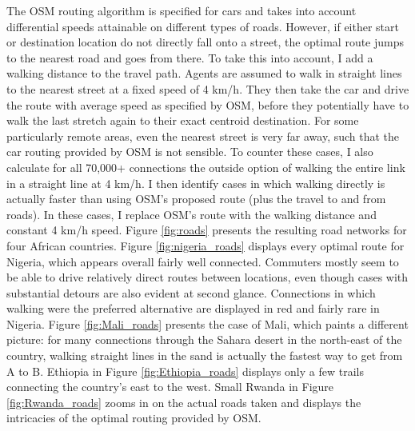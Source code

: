 \documentclass[11pt, oneside]{article}   	%
\begin{document}
The OSM routing algorithm is specified for cars and takes into account differential speeds attainable on different types of roads. However, if either start or destination location do not directly fall onto a street, the optimal route jumps to the nearest road and goes from there. To take this into account, I add a walking distance to the travel path. Agents are assumed to walk in straight lines to the nearest street at a fixed speed of 4 km/h. They then take the car and drive the route with average speed as specified by OSM, before they potentially have to walk the last stretch again to their exact centroid destination. For some particularly remote areas, even the nearest street is very far away, such that the car routing provided by OSM is not sensible. To counter these cases, I also calculate for all 70,000+ connections the outside option of walking the entire link in a straight line at 4 km/h. I then identify cases in which walking directly is actually faster than using OSM's proposed route (plus the travel to and from roads). In these cases, I replace OSM's route with the walking distance and constant 4 km/h speed. Figure \eqref{fig:roads} presents the resulting road networks for four African countries. Figure \eqref{fig:nigeria_roads} displays every optimal route for Nigeria, which appears overall fairly well connected. Commuters mostly seem to be able to drive relatively direct routes between locations, even though cases with substantial detours are also evident at second glance. Connections in which walking were the preferred alternative are displayed in red and fairly rare in Nigeria. Figure \eqref{fig:Mali_roads} presents the case of Mali, which paints a different picture: for many connections through the Sahara desert in the north-east of the country, walking straight lines in the sand is actually the fastest way to get from A to B. Ethiopia in Figure \eqref{fig:Ethiopia_roads} displays only a few trails connecting the country's east to the west. Small Rwanda in Figure \eqref{fig:Rwanda_roads} zooms in on the actual roads taken and displays the intricacies of the optimal routing provided by OSM.
\end{document}
